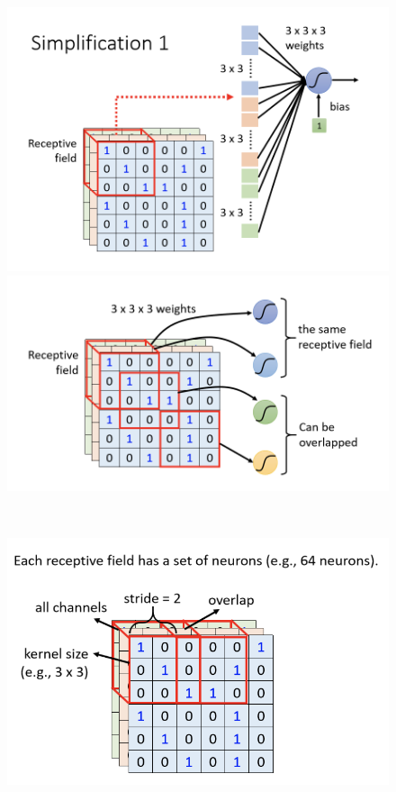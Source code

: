 \documentclass{article}
\begin{document}
\begin{figure}[H]
	\begin{minipage}[t]{0.5\linewidth}
		\centering
		\includegraphics[scale=0.45]{picture/Convolution1.png}
	\end{minipage}
    \quad
	\begin{minipage}[t]{0.5\linewidth}
		\centering
		\includegraphics[scale=0.45]{picture/Convolution2.png}
	\end{minipage}
	\\
	\begin{minipage}[t]{0.5\linewidth}
		\centering
		\includegraphics[scale=0.45]{picture/Convolution3.png}

\end{minipage}
\end{figure}
\end{document}
